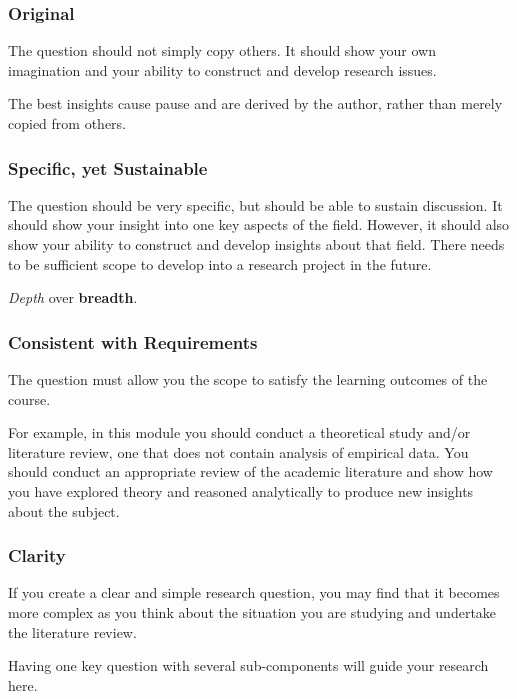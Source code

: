 \begin{frame}
	\frametitle{Original}
		
	The question should not simply copy others.
	It should show your own imagination and your ability to construct and develop research issues. 
	
	\vspace{2em}
	
	The best insights cause pause and are derived by the author, rather than merely copied from others.
\end{frame}

\begin{frame}
	\frametitle{Specific, yet Sustainable}
		
	The question should be very specific, but should be able to sustain discussion.
	It should show your insight into one key aspects of the field. However, it should also show your ability to construct and develop insights about that field. 
	There needs to be sufficient scope to develop into a research project in the future.

	\vspace{2em}

	\textit{Depth} over \textbf{breadth}.
\end{frame}

\begin{frame}
	\frametitle{Consistent with Requirements}
		
	The question must allow you the scope to satisfy the learning outcomes of the course.
	
	\vspace{2em}
	
	For example, in this module you should conduct a theoretical study and/or literature review, one that does not contain analysis of empirical data. 
	You should conduct an appropriate review of the academic literature and show how you have explored theory and reasoned analytically to produce new insights about the subject.
\end{frame}

\begin{frame}
	\frametitle{Clarity}
		
	If you create a clear and simple research question, you may find that it becomes more complex as you think about the situation you are studying and undertake the literature review. 
	
	\vspace{2em}
	
	Having one key question with several sub-components will guide your research here.
\end{frame}

